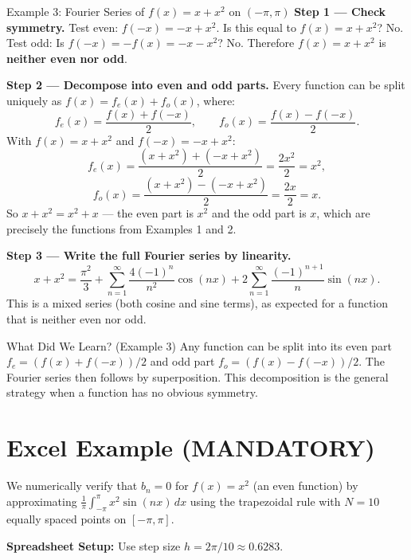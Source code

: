 \documentclass[12pt,a4paper]{article}
\begin{document}
\begin{infobox}{Example 3: Fourier Series of $f(x) = x + x^2$ on $(-\pi, \pi)$}
\textbf{Step 1 --- Check symmetry.}
Test even: $f(-x) = -x + x^2$. Is this equal to $f(x) = x + x^2$? No.
Test odd: Is $f(-x) = -f(x) = -x - x^2$? No.
Therefore $f(x) = x + x^2$ is \textbf{neither even nor odd}.

\medskip
\textbf{Step 2 --- Decompose into even and odd parts.}
Every function can be split uniquely as $f(x) = f_e(x) + f_o(x)$, where:
\[
  f_e(x) = \frac{f(x) + f(-x)}{2}, \qquad
  f_o(x) = \frac{f(x) - f(-x)}{2}.
\]
With $f(x) = x + x^2$ and $f(-x) = -x + x^2$:
\[
  f_e(x) = \frac{(x+x^2)+(-x+x^2)}{2} = \frac{2x^2}{2} = x^2,
\]
\[
  f_o(x) = \frac{(x+x^2)-(-x+x^2)}{2} = \frac{2x}{2} = x.
\]
So $x + x^2 = x^2 + x$ --- the even part is $x^2$ and the odd part is $x$, which are
precisely the functions from Examples 1 and 2.

\medskip
\textbf{Step 3 --- Write the full Fourier series by linearity.}
\[
  x + x^2 = \frac{\pi^2}{3} + \sum_{n=1}^{\infty}\frac{4(-1)^n}{n^2}\cos(nx)
             + 2\sum_{n=1}^{\infty}\frac{(-1)^{n+1}}{n}\sin(nx).
\]
This is a mixed series (both cosine and sine terms), as expected for a function that is
neither even nor odd.
\end{infobox}

\begin{learnbox}{What Did We Learn? (Example 3)}
Any function can be split into its even part $f_e = (f(x)+f(-x))/2$ and odd part
$f_o = (f(x)-f(-x))/2$. The Fourier series then follows by superposition. This decomposition
is the general strategy when a function has no obvious symmetry.
\end{learnbox}

\section{Excel Example (MANDATORY)}

We numerically verify that $b_n = 0$ for $f(x) = x^2$ (an even function) by approximating
$\frac{1}{\pi}\int_{-\pi}^{\pi} x^2\sin(nx)\,dx$ using the trapezoidal rule with
$N = 10$ equally spaced points on $[-\pi, \pi]$.

\textbf{Spreadsheet Setup:} Use step size $h = 2\pi/10 \approx 0.6283$.
\end{document}
